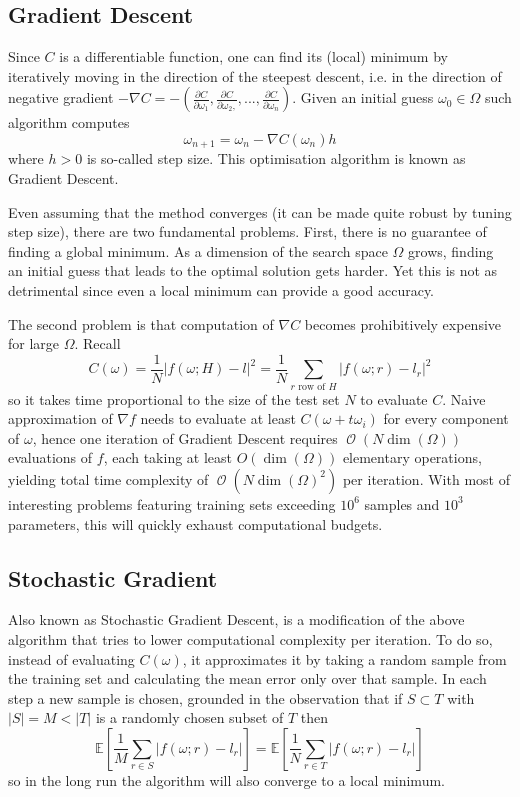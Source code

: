 \documentclass[a4paper,11pt]{article}
\theoremstyle{break}
\newcommand{\Exp}{\mathbb{E}}
\DeclareMathOperator{\bO}{\mathcal{O}}
\begin{document}
\subsection{Gradient Descent}
Since $C$ is a differentiable function, one can find its (local) minimum by iteratively moving in the direction of the steepest descent, i.e. in the direction of negative gradient
$ - \nabla C  = - ( \frac{\partial C}{\partial \omega_1}, \frac{\partial C}{\partial \omega_2, }, ..., \frac{\partial C}{\partial \omega_n})$.
Given an initial guess $\omega_0 \in \Omega$ such algorithm computes
    $$ \omega_{n+1} = \omega_{n} - \nabla C (\omega_n) h $$
where $h > 0$ is so-called step size. This optimisation algorithm is known as Gradient Descent.

Even assuming that the method converges (it can be made quite robust by tuning step size), there are two fundamental problems.
First, there is no guarantee of finding a global minimum.
As a dimension of the search space $ \Omega $ grows, finding an initial guess that leads to the optimal solution gets harder.
Yet this is not as detrimental since even a local minimum can provide a good accuracy.

The second problem is that computation of $\nabla C$ becomes prohibitively expensive for large $ \Omega $. Recall
    $$ C(\omega) =  \frac{1}{N} | f(\omega; H) - l |^2 =
       \frac{1}{N} \sum_{r \text{ row of } H} | f(\omega; r) - l_r |^2 $$
so it takes time proportional to the size of the test set $N$ to evaluate $C$.
Naive approximation of $ \nabla f$ needs to evaluate at least $C(\omega + t \omega_i)$ for every component of $ \omega $, hence one iteration of Gradient Descent requires $ \bO( N  \dim(\Omega) ) $ evaluations of $f$,
each taking at least $ O( \dim(\Omega))$ elementary operations, yielding total time complexity of $ \bO( N \dim(\Omega)^2)$ per iteration.
With most of interesting problems featuring training sets exceeding $ 10^6 $ samples and $ 10^3 $ parameters, this will quickly exhaust computational budgets.

\subsection{Stochastic Gradient}
Also known as Stochastic Gradient Descent, is a modification of the above algorithm that tries to lower computational complexity per iteration.
To do so, instead of evaluating $C(\omega)$, it approximates it by taking a random sample from the training set and calculating the mean error only over that sample.
In each step a new sample is chosen, grounded in the observation that if $ S \subset T $ with $ | S | = M < |T| $ is a randomly chosen subset of $T$ then
    $$ \Exp \left[ \frac{1}{M} \sum_{r \in S} | f(\omega; r) - l_r | \right] =
       \Exp \left[ \frac{1}{N} \sum_{r \in T} | f(\omega; r) - l_r | \right] $$
so in the long run the algorithm will also converge to a local minimum.
\end{document}

